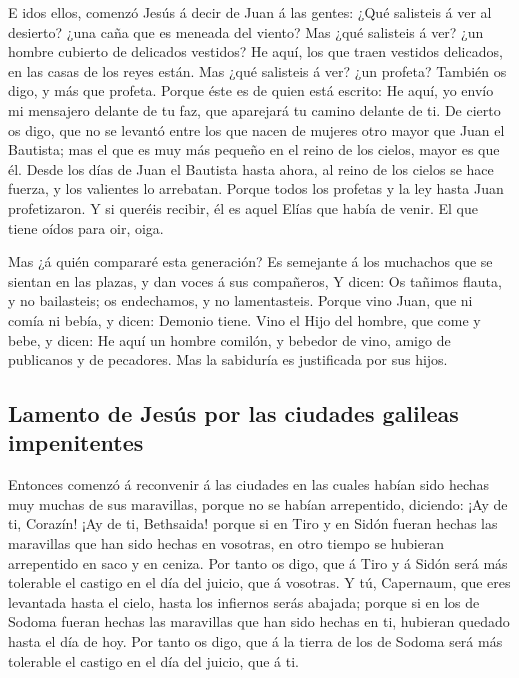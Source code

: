  E idos ellos, comenzó Jesús á decir de Juan á las gentes:
¿Qué salisteis á ver al desierto? ¿una caña que es meneada del viento?
 Mas ¿qué salisteis á ver? ¿un hombre cubierto de
delicados vestidos? He aquí, los que traen vestidos delicados, en las
casas de los reyes están.  Mas ¿qué salisteis á ver? ¿un
profeta? También os digo, y más que profeta.  Porque éste
es de quien está escrito: He aquí, yo envío mi mensajero delante de tu
faz, que aparejará tu camino delante de ti.  De cierto os
digo, que no se levantó entre los que nacen de mujeres otro mayor que
Juan el Bautista; mas el que es muy más pequeño en el reino de los
cielos, mayor es que él.  Desde los días de Juan el
Bautista hasta ahora, al reino de los cielos se hace fuerza, y los
valientes lo arrebatan.  Porque todos los profetas y la
ley hasta Juan profetizaron.  Y si queréis recibir, él es
aquel Elías que había de venir.  El que tiene oídos para
oir, oiga.

 Mas ¿á quién compararé esta generación? Es semejante á
los muchachos que se sientan en las plazas, y dan voces á sus
compañeros,  Y dicen: Os tañimos flauta, y no bailasteis;
os endechamos, y no lamentasteis.  Porque vino Juan, que
ni comía ni bebía, y dicen: Demonio tiene.  Vino el Hijo
del hombre, que come y bebe, y dicen: He aquí un hombre comilón, y
bebedor de vino, amigo de publicanos y de pecadores. Mas la sabiduría es
justificada por sus hijos.

\hypertarget{lamento-de-jesuxfas-por-las-ciudades-galileas-impenitentes}{%
\subsection{Lamento de Jesús por las ciudades galileas
impenitentes}\label{lamento-de-jesuxfas-por-las-ciudades-galileas-impenitentes}}

 Entonces comenzó á reconvenir á las ciudades en las
cuales habían sido hechas muy muchas de sus maravillas, porque no se
habían arrepentido, diciendo:  ¡Ay de ti, Corazín! ¡Ay de
ti, Bethsaida! porque si en Tiro y en Sidón fueran hechas las maravillas
que han sido hechas en vosotras, en otro tiempo se hubieran arrepentido
en saco y en ceniza.  Por tanto os digo, que á Tiro y á
Sidón será más tolerable el castigo en el día del juicio, que á
vosotras.  Y tú, Capernaum, que eres levantada hasta el
cielo, hasta los infiernos serás abajada; porque si en los de Sodoma
fueran hechas las maravillas que han sido hechas en ti, hubieran quedado
hasta el día de hoy.  Por tanto os digo, que á la tierra
de los de Sodoma será más tolerable el castigo en el día del juicio, que
á ti.

